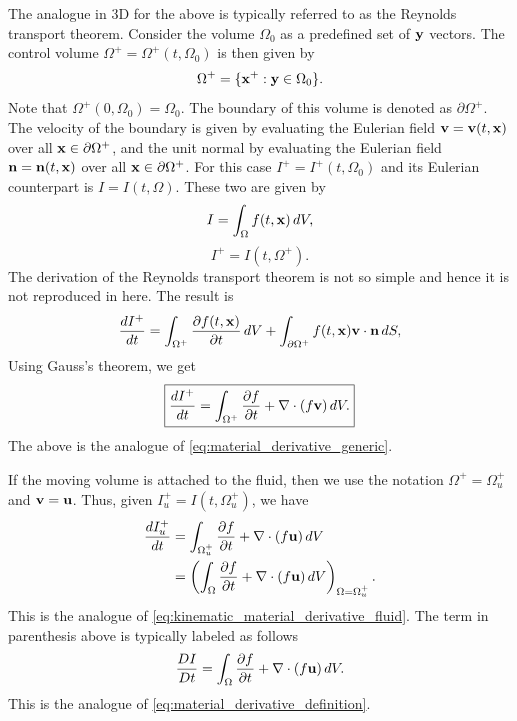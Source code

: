 \documentclass[oneside,a4paper,11pt]{report}
\begin{document}
The analogue in 3D for the above is typically referred to as the Reynolds transport theorem. Consider the volume $\Omega_0$ as a predefined set of $\mathbf{y}$ vectors. The control volume $\Omega^+ = \Omega^+(t, \Omega_0)$ is then given by
\begin{equation}
    \Omega^+ = \{ \mathbf{x}^+:\mathbf{y} \in \Omega_0 \}.
\end{equation}
Note that $\Omega^+(0,\Omega_0) = \Omega_0$. The boundary of this volume is denoted as $\partial \Omega^+$. The velocity of the boundary is given by evaluating the Eulerian field $\mathbf{v} = \mathbf{v}(t,\mathbf{x})$ over all $\mathbf{x} \in \partial \Omega^+$, and the unit normal by evaluating the Eulerian field $\mathbf{n} = \mathbf{n}(t,\mathbf{x})$ over all $\mathbf{x} \in \partial \Omega^+$. For this case $I^+ = I^+(t,\Omega_0)$ and its Eulerian counterpart is $I = I(t,\Omega)$. These two are given by
\begin{equation}
    I = \int_\Omega f(t,\mathbf{x}) \,dV,
\end{equation}
\begin{equation}
    I^+ = I(t,\Omega^+).
\end{equation}
The derivation of the Reynolds transport theorem is not so simple and hence it is not reproduced in here. The result is
\begin{equation}
  \frac{d I^+}{dt} = \int_{\Omega^+} \frac{\partial f(t,\mathbf{x})}{\partial t} \, dV + \int_{\partial \Omega^+} f(t,\mathbf{x}) \mathbf{v} \cdot \mathbf{n} \, dS,
\end{equation}
Using Gauss's theorem, we get
\begin{equation}
\label{eq:reynolds_transport_theorem_generic}
\boxed{
  \frac{d I^+}{dt} = \int_{\Omega^+} \frac{\partial f}{\partial t} + \nabla \cdot (f \mathbf{v} ) \, dV .
}
\end{equation}
The above is the analogue of \cref{eq:material_derivative_generic}. 

If the moving volume is attached to the fluid, then we use the notation $\Omega^+ = \Omega^+_u$ and $\mathbf{v} = \mathbf{u}$. Thus, given $I^+_u = I(t,\Omega^+_u)$, we have
\begin{align}
\label{eq:reynolds_transport_theorem_fluid}
  \frac{d I^+_u}{dt} &=  \int_{\Omega^+_u} \frac{\partial f}{\partial t} + \nabla \cdot ( f \mathbf{u} ) \, dV  \nonumber \\
  &=\left ( \int_{\Omega} \frac{\partial f}{\partial t} + \nabla \cdot ( f \mathbf{u} ) \, dV \right )_{\Omega = \Omega^+_u}.
\end{align}
This is the analogue of \cref{eq:kinematic_material_derivative_fluid}. The term in parenthesis above is typically labeled as follows
\begin{equation}
    \frac{DI}{Dt} = \int_{\Omega} \frac{\partial f}{\partial t} + \nabla \cdot ( f \mathbf{u} ) \, dV.
\end{equation}
This is the analogue of \cref{eq:material_derivative_definition}.
\end{document}
